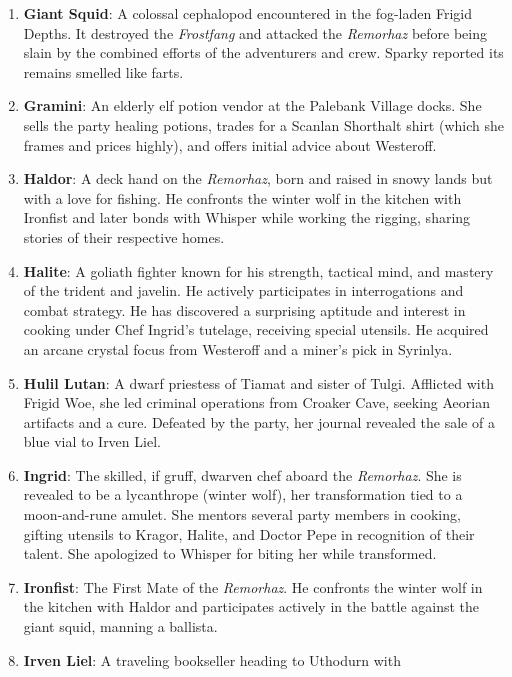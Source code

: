 \documentclass[
  letterpaper,12pt,twoside,twocolumn,openany,
  nodeprecatedcode,bg=full]{dndbook}
\begin{document}
\begin{enumerate}
  party for now, seeking rest and direction. He carries ship insurance
  procured from an Empire contact.
\item
  \textbf{Giant Squid}: A colossal cephalopod encountered in the
  fog-laden Frigid Depths. It destroyed the \emph{Frostfang} and
  attacked the \emph{Remorhaz} before being slain by the combined
  efforts of the adventurers and crew. Sparky reported its remains
  smelled like farts.
\item
  \textbf{Gramini}: An elderly elf potion vendor at the Palebank Village
  docks. She sells the party healing potions, trades for a Scanlan
  Shorthalt shirt (which she frames and prices highly), and offers
  initial advice about Westeroff.
\item
  \textbf{Haldor}: A deck hand on the \emph{Remorhaz}, born and raised
  in snowy lands but with a love for fishing. He confronts the winter
  wolf in the kitchen with Ironfist and later bonds with Whisper while
  working the rigging, sharing stories of their respective homes.
\item
  \textbf{Halite}: A goliath fighter known for his strength, tactical
  mind, and mastery of the trident and javelin. He actively participates
  in interrogations and combat strategy. He has discovered a surprising
  aptitude and interest in cooking under Chef Ingrid's tutelage,
  receiving special utensils. He acquired an arcane crystal focus from
  Westeroff and a miner's pick in Syrinlya.
\item
  \textbf{Hulil Lutan}: A dwarf priestess of Tiamat and sister of Tulgi.
  Afflicted with Frigid Woe, she led criminal operations from Croaker
  Cave, seeking Aeorian artifacts and a cure. Defeated by the party, her
  journal revealed the sale of a blue vial to Irven Liel.
\item
  \textbf{Ingrid}: The skilled, if gruff, dwarven chef aboard the
  \emph{Remorhaz}. She is revealed to be a lycanthrope (winter wolf),
  her transformation tied to a moon-and-rune amulet. She mentors several
  party members in cooking, gifting utensils to Kragor, Halite, and
  Doctor Pepe in recognition of their talent. She apologized to Whisper
  for biting her while transformed.
\item
  \textbf{Ironfist}: The First Mate of the \emph{Remorhaz}. He confronts
  the winter wolf in the kitchen with Haldor and participates actively
  in the battle against the giant squid, manning a ballista.
\item
  \textbf{Irven Liel}: A traveling bookseller heading to Uthodurn with

\end{enumerate}
\end{document}
